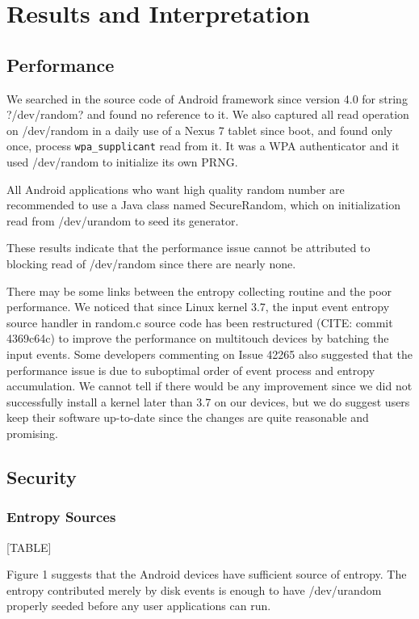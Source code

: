 \section{Results and Interpretation}


\subsection{Performance}

We searched in the source code of Android framework since version 4.0 for string ?/dev/random? and found no reference to it. We also captured all read operation on /dev/random in a daily use of a Nexus 7 tablet since boot, and found only once, process \verb|wpa_supplicant| read from it. It was a WPA authenticator and it used /dev/random to initialize its own PRNG.

All Android applications who want high quality random number are recommended to use a Java class named SecureRandom, which on initialization read from /dev/urandom to seed its generator.

These results indicate that the performance issue cannot be attributed to blocking read of /dev/random since there are nearly none.

There may be some links between the entropy collecting routine and the poor performance. We noticed that since Linux kernel 3.7, the input event entropy source handler in random.c source code has been restructured (CITE: commit 4369c64c) to improve the performance on multitouch devices by batching the input events. Some developers commenting on Issue 42265 also suggested that the performance issue is due to suboptimal order of event process and entropy accumulation. We cannot tell if there would be any improvement since we did not successfully install a kernel later than 3.7 on our devices, but we do suggest users keep their software up-to-date since the changes are quite reasonable and promising.

\subsection{Security}

\subsubsection{Entropy Sources}

[TABLE]

Figure 1 suggests that the Android devices have sufficient source of entropy. The entropy contributed merely by disk events is enough to have /dev/urandom properly seeded before any user applications can run.


